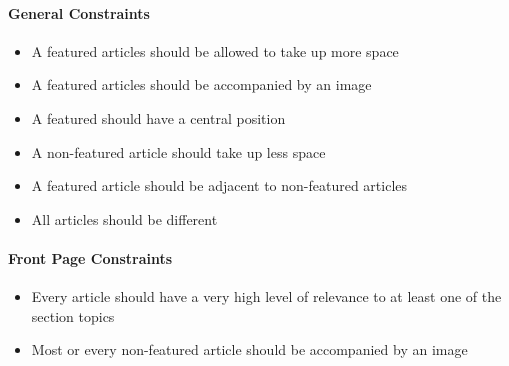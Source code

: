 \paragraph{General Constraints}
\label{sec:analysis_mix}
\begin{itemize}\itemdist
	\item A featured articles should be allowed to take up more space
	\item A featured articles should be accompanied by an image
	\item A featured should have a central position
	\item A non-featured article should take up less space
	\item A featured article should be adjacent to non-featured articles
	\item All articles should be different
\end{itemize}

\paragraph{Front Page Constraints}
\begin{itemize}\itemdist
	\item Every article should have a very high level of relevance to at least one of the section topics
	\item Most or every non-featured article should be accompanied by an image
\end{itemize}

